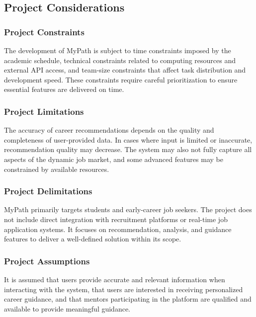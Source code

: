 \documentclass[12pt,a4paper]{article}
\begin{document}
\subsection{Project Considerations}

\subsubsection{Project Constraints}

The development of MyPath is subject to time constraints imposed by the academic schedule, technical constraints related to computing resources and external API access, and team-size constraints that affect task distribution and development speed. These constraints require careful prioritization to ensure essential features are delivered on time.

\subsubsection{Project Limitations}

The accuracy of career recommendations depends on the quality and completeness of user-provided data. In cases where input is limited or inaccurate, recommendation quality may decrease. The system may also not fully capture all aspects of the dynamic job market, and some advanced features may be constrained by available resources.

\subsubsection{Project Delimitations}

MyPath primarily targets students and early-career job seekers. The project does not include direct integration with recruitment platforms or real-time job application systems. It focuses on recommendation, analysis, and guidance features to deliver a well-defined solution within its scope.

\subsubsection{Project Assumptions}

It is assumed that users provide accurate and relevant information when interacting with the system, that users are interested in receiving personalized career guidance, and that mentors participating in the platform are qualified and available to provide meaningful guidance.
\end{document}
